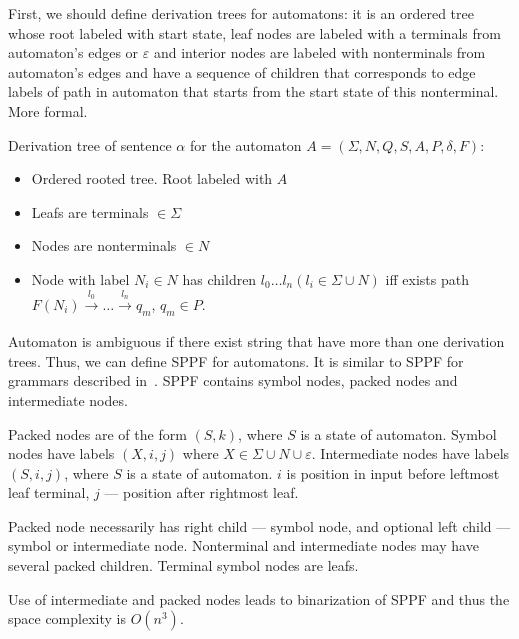 \documentclass[runningheads,a4paper]{llncs}
\begin{document}
First, we should define derivation trees for automatons: it is an ordered tree whose root labeled with start state,
leaf nodes are labeled with a terminals from automaton's edges or $\varepsilon$ and interior nodes are labeled with 
nonterminals from automaton's edges and have a sequence of children that corresponds to edge labels of path in 
automaton that starts from the start state of this nonterminal. More formal. 

\begin{mydef}

Derivation tree of sentence $\alpha$ for the automaton $A=(\Sigma, N, Q, S, A, P, \delta, F)$:%

\begin{itemize}
\item Ordered rooted tree. Root labeled with $A$
\item Leafs are terminals $\in \Sigma$
\item Nodes are nonterminals $\in N$
\item Node with label $N_i \in N$ has children $l_0 \dots l_n (l_i \in \Sigma \cup N)$ iff exists
path
$F(N_i) \xrightarrow[]{l_0} \dots \xrightarrow{l_n} q_m$, $q_m \in P$. 
\end{itemize}

\end{mydef}

Automaton is ambiguous if there exist string that have more than one derivation trees. Thus, we can define SPPF for automatons. 
It is similar to SPPF for grammars described in~\cite{scott2013gll}. SPPF contains symbol nodes, packed nodes
and intermediate nodes. 

Packed nodes are of the form $(S, k)$, where $S$ is a state of automaton. 
Symbol nodes have labels $(X, i, j)$ where $X \in \Sigma \cup N \cup \varepsilon$. 
Intermediate nodes have labels $ (S, i, j) $, where $S$ is a state of automaton. $i$ is position in input before leftmost leaf terminal, $j$ --- position after rightmost leaf.

Packed node necessarily has right child --- symbol node, and optional left child --- symbol or intermediate node.
Nonterminal and intermediate nodes may have several packed children. 
Terminal symbol nodes are leafs.

Use of intermediate and packed nodes leads to binarization of SPPF and thus the space complexity is $O(n^{3})$.
\end{document}

